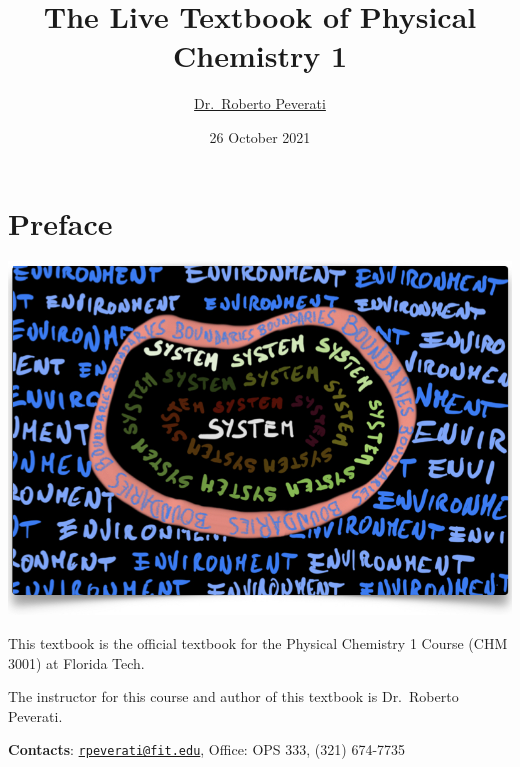 \documentclass[
  9pt,
]{extbook}
\title{The Live Textbook of Physical Chemistry 1}
\author{\href{mailto:rpeverati@fit.edu}{Dr.~Roberto Peverati}}
\date{26 October 2021}
\let\oldmaketitle\maketitle
\theoremstyle{definition}
\theoremstyle{definition}
\theoremstyle{definition}
\theoremstyle{remark}
\begin{document}
\maketitle


%
\newpage

\let\maketitle\oldmaketitle

\renewcommand\thepage{\romannumeral\numexpr\value{page}-1\relax}


{
\setcounter{tocdepth}{1}
\tableofcontents
}
\renewcommand{\arraystretch}{1.8}

\hypertarget{preface}{%
\chapter*{Preface}\label{preface}}

\begin{center}\includegraphics[width=0.8\linewidth]{./img/OEP_Figures.000} \end{center}

This textbook is the official textbook for the Physical Chemistry 1 Course (CHM 3001) at Florida Tech.

The instructor for this course and author of this textbook is Dr.~Roberto Peverati.

\textbf{Contacts}: \href{mailto:rpeverati@fit.edu}{\nolinkurl{rpeverati@fit.edu}}, Office: OPS 333, (321) 674-7735
\end{document}
